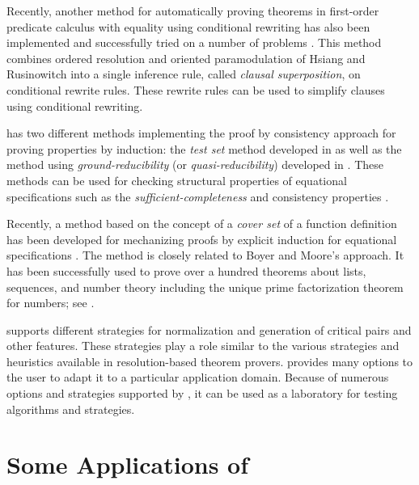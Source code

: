 Recently, another method for automatically proving theorems in
first-order predicate calculus with equality using conditional
rewriting has also been implemented and successfully tried on a number
of problems \cite{ZK88}.  This method combines ordered resolution and
oriented paramodulation of Hsiang and Rusinowitch \cite{HR86} into a
single inference rule, called {\it clausal superposition}, on
conditional rewrite rules. These rewrite rules can be used to simplify clauses
using conditional rewriting.

\RRL has two different methods implementing
the proof by consistency approach for proving
properties by induction: the {\em test set} method developed in
\cite{KNZ86} as well as the method using {\em ground-reducibility}
(or {\em quasi-reducibility})
developed in \cite{JK86}.  These methods can be used for checking
structural properties of equational specifications such as the {\em
sufficient-completeness} \cite{KNZ85} and consistency properties
\cite{Musser80,KapurMusser84}.

Recently, a method based on the concept of a {\it cover set} of a
function definition has been developed for mechanizing proofs by
explicit induction for equational specifications \cite{ZKM88,Zhang88}.  The
method is closely related to Boyer and Moore's approach.  It
has been successfully used to prove over a hundred theorems about
lists, sequences, and number theory including the unique prime
factorization theorem for numbers; see \cite{ZKM88,Zhang88}.
 
\RRL supports different strategies for normalization and generation of
critical pairs and other features. These strategies play a role
similar to the various strategies and heuristics available in
resolution-based theorem provers. \RRL provides many options to the
user to adapt it to a particular application domain. Because of
numerous options and strategies supported by \ERRL, it can be used as a
laboratory for testing algorithms and strategies. 

\section{Some Applications of \RRL}
 
